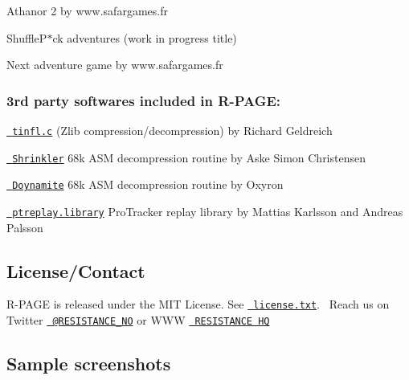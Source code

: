\begin{DoxyItemize}
\item Athanor 2 by www.\+safargames.\+fr
\item Shuffle\+P$\ast$ck adventures (work in progress title)
\item Next adventure game by www.\+safargames.\+fr
\end{DoxyItemize}

\subsubsection*{3rd party softwares included in R-\/\+P\+A\+GE\+:}


\begin{DoxyItemize}
\item \href{https://github.com/richgel999/miniz}{\texttt{ tinfl.\+c}} (Zlib compression/decompression) by Richard Geldreich
\item \href{https://github.com/askeksa/Shrinkler}{\texttt{ Shrinkler}} 68k A\+SM decompression routine by Aske Simon Christensen
\item \href{https://github.com/AxisOxy/Planet-Rocklobster}{\texttt{ Doynamite}} 68k A\+SM decompression routine by Oxyron
\item \href{http://aminet.net/package/mus/play/ptreplay66}{\texttt{ ptreplay.\+library}} Pro\+Tracker replay library by Mattias Karlsson and Andreas Palsson
\end{DoxyItemize}

\subsection*{License/\+Contact}

R-\/\+P\+A\+GE is released under the M\+IT License. See \href{license.txt}{\texttt{ license.\+txt}}.~\newline
 Reach us on Twitter \href{https://twitter.com/RESISTANCE_NO}{\texttt{ @\+R\+E\+S\+I\+S\+T\+A\+N\+C\+E\+\_\+\+NO}} or W\+WW \href{https://resistance.no/}{\texttt{ R\+E\+S\+I\+S\+T\+A\+N\+CE HQ}}

\subsection*{Sample screenshots}

   